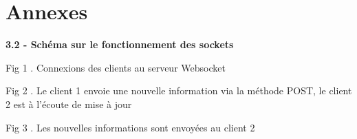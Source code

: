 \documentclass[12pt, openany]{report}
\begin{document}
\chapter{Annexes}

\textbf{3.2 - Schéma sur le fonctionnement des sockets}

\begin{center}
\centering
{}
\caption{Fig 1 . Connexions des clients au serveur Websocket}
\caption{Fig 2 . Le client 1 envoie une nouvelle information via la méthode POST, le client 2 est à
l’écoute de mise à jour}
\newline\newline
{}
\caption{Fig 3 . Les nouvelles informations sont envoyées au client 2}
\end{center}
\end{document}

